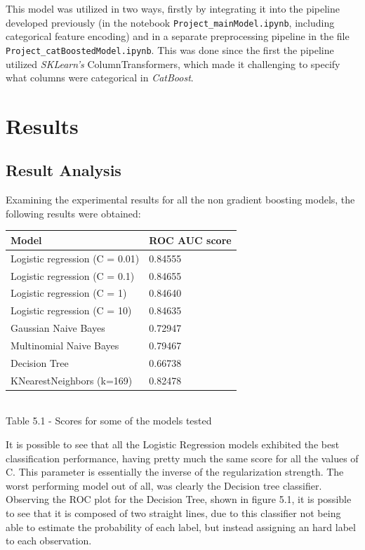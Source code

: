 \documentclass{IEEEtran}
\begin{document}
This model was utilized in two ways, firstly by integrating it into the pipeline developed previously (in the notebook \texttt{Project\_mainModel.ipynb}, including categorical feature encoding) and in a separate preprocessing pipeline in the file \texttt{Project\_catBoostedModel.ipynb}. This was done since the first the pipeline utilized \textit{SKLearn's} ColumnTransformers, which made it challenging to specify what columns were categorical in \textit{CatBoost}.

\section{Results}

\subsection{Result Analysis}

Examining the experimental results for all the non gradient boosting models, the following results were obtained:

\begin{center}
    \begin{tabular}{|l|l|}
        \hline
    \textbf{Model} & \textbf{ROC AUC score} \\ 
    \hline \hline
    Logistic regression (C = 0.01) & 0.84555 \\ \hline
    Logistic regression (C = 0.1) & 0.84655 \\ \hline
    Logistic regression (C = 1) & 0.84640 \\ \hline
    Logistic regression (C = 10) & 0.84635 \\ \hline
    Gaussian Naive Bayes & 0.72947 \\ \hline
    Multinomial Naive Bayes & 0.79467 \\ \hline
    Decision Tree & 0.66738 \\ \hline
    KNearestNeighbors (k=169) & 0.82478 \\ \hline
    \end{tabular}\\
    \vspace{7pt}
    Table 5.1 - Scores for some of the models tested
\end{center}

It is possible to see that all the Logistic Regression models exhibited the best classification performance, having pretty much the same score for all the values of C. This parameter is essentially the inverse of the regularization strength. 
The worst performing model out of all, was clearly the Decision tree classifier. Observing the ROC plot for the Decision Tree, shown in figure 5.1, it is possible to see that it is composed of two straight lines, due to this classifier not being able to estimate the probability of each label, but instead assigning an hard label to each observation.
\end{document}
